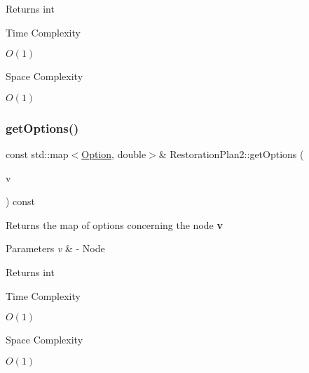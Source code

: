 \begin{DoxyReturn}{Returns}
int 
\end{DoxyReturn}
\begin{DoxyRefDesc}{Time Complexity}
\item[\hyperlink{time__time000027}{Time Complexity}]$O(1)$ \end{DoxyRefDesc}
\begin{DoxyRefDesc}{Space Complexity}
\item[\hyperlink{space__space000027}{Space Complexity}]$O(1)$ \end{DoxyRefDesc}
\mbox{\label{class_restoration_plan2_ad5677cfb92c07bdfa6c3414940ae6401}} 
\subsubsection{\texorpdfstring{get\+Options()}{getOptions()}\hspace{0.1cm}{\footnotesize\ttfamily [1/2]}}
{\footnotesize\ttfamily const std\+::map$<$\hyperlink{class_restoration_plan2_aff164a2726831342bf87af5e11df1064}{Option}, double$>$\& Restoration\+Plan2\+::get\+Options (\begin{DoxyParamCaption}\item[{Graph\+\_\+t\+::\+Node}]{v }\end{DoxyParamCaption}) const\hspace{0.3cm}{\ttfamily [inline]}}



Returns the map of options concerning the node {\bfseries v} 


\begin{DoxyParams}{Parameters}
{\em v} & -\/ Node \\
\hline
\end{DoxyParams}
\begin{DoxyReturn}{Returns}
int 
\end{DoxyReturn}
\begin{DoxyRefDesc}{Time Complexity}
\item[\hyperlink{time__time000028}{Time Complexity}]$O(1)$ \end{DoxyRefDesc}
\begin{DoxyRefDesc}{Space Complexity}
\item[\hyperlink{space__space000028}{Space Complexity}]$O(1)$ \end{DoxyRefDesc}
\mbox{\label{class_restoration_plan2_a04acf02934f7b06d3540c2bc68de73d0}} 
